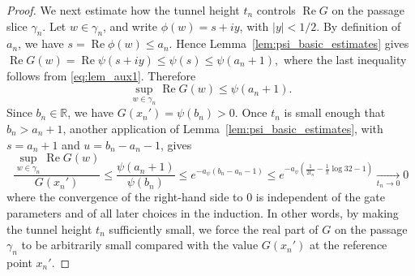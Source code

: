 \documentclass[a4paper, 11pt, reqno]{amsart}
\numberwithin{equation}{section}
\theoremstyle{plain}
\theoremstyle{remark}
\newcommand{\R}{{\mathbb{R}}}
\newcommand{\Rea}{\operatorname{Re }}
\begin{document}
\begin{proof}
	
	
	We next estimate how the tunnel height \(t_n\) controls \(\Rea G\) on the passage slice \(\gamma_n\). Let \(w\in\gamma_n\),
	and write \(\phi(w)=s+iy\), with \(|y|<1/2\). By definition of \(a_n\),
	we have \(s=\Rea\phi(w)\le a_n\). Hence Lemma~\ref{lem:psi_basic_estimates}
	gives
	$
	\Rea G(w)
	=
	\Rea\psi(s+iy)
	\le
	\psi(s)
	\le
	\psi(a_n+1),
	$
	where the last inequality follows from \eqref{eq:lem_aux1}. Therefore
	\[
	\sup_{w\in\gamma_n}\Rea G(w)
	\le
	\psi(a_n+1).
	\]
	Since \(b_n\in\R\), we have \(G(x_n')=\psi(b_n)>0\). Once \(t_n\) is small
	enough that \(b_n>a_n+1\), another application of
	Lemma~\ref{lem:psi_basic_estimates}, with \(s=a_n+1\) and
	\(u=b_n-a_n-1\), gives
	\begin{equation}\label{eq:in41_G}
		\frac{\sup_{w\in\gamma_n}\Rea G(w)}{G(x_n')}
		\le
		\frac{\psi(a_n+1)}{\psi(b_n)}
		\le
		e^{-a_\psi(b_n-a_n-1)}	\le
		e^{
			-a_\psi\left(\frac{1}{2t_n}-\frac{1}{\pi}\log32-1\right)} \xrightarrow[t_n\to0]{}0
	\end{equation}
	where the convergence of the right-hand side to \(0\) is independent of
	the gate parameters and of all later choices in the induction. In other words, by making the tunnel height \(t_n\) sufficiently small, we
	force the real part of \(G\) on the passage \(\gamma_n\) to be arbitrarily
	small compared with the value \(G(x_n')\) at the reference point
	\(x_n'\).
	

\end{proof}
\end{document}
